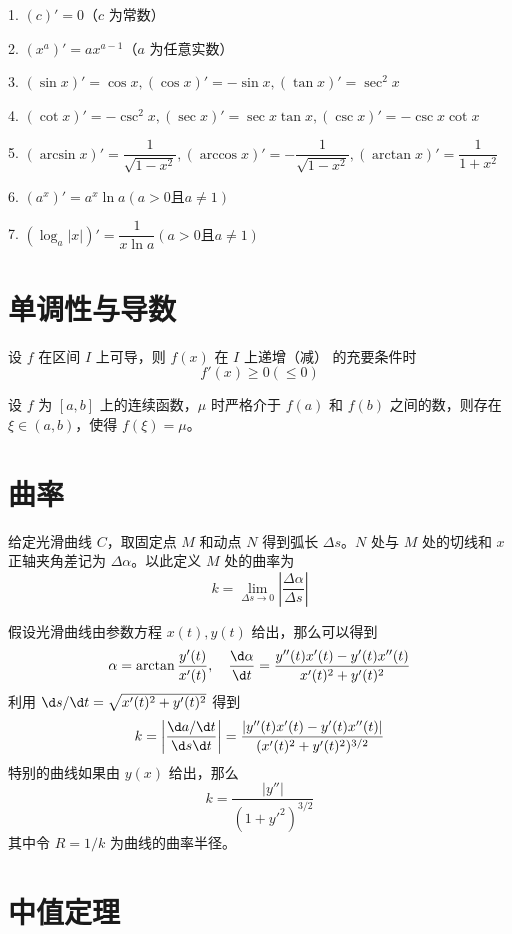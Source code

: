 1. $(c)' = 0$（$c$ 为常数）

2. $(x^a)' = ax^{a-1}$（$a$ 为任意实数）

3. $(\sin x)' = \cos x,(\cos x)'=-\sin x,(\tan x)'=\sec^2x$

4. $(\cot x)' = -\csc^2 x,(\sec x)'=\sec x \tan x,(\csc x)'=-\csc x \cot x$

5. $(\arcsin x)'=\dfrac{1}{\sqrt{1-x^2}},(\arccos x)' = -\dfrac{1}{\sqrt{1-x^2}},(\arctan x)'=\dfrac{1}{1+x^2}$

6. $(a^x)'=a^x \ln a(a>0\text{且}a\ne 1)$

7. $(\log_a|x|)'=\dfrac{1}{x\ln a}(a>0\text{且}a\ne 1)$

\section{单调性与导数}

\begin{theorem}
	设 $f$ 在区间 $I$ 上可导，则 $f(x)$ 在 $I$ 上递增（减） 的充要条件时
	$$f'(x) \geqslant 0(\leqslant 0)$$
\end{theorem}

\begin{theorem}[介值定理]
	设 $f$ 为 $[a,b]$ 上的连续函数，$\mu$ 时严格介于 $f(a)$ 和 $f(b)$ 之间的数，则存在 $\xi\in (a,b)$，使得 $f(\xi)=\mu$。
\end{theorem}

\section{曲率}

给定光滑曲线 $C$，取固定点 $M$ 和动点 $N$ 得到弧长 $\Delta s$。$N$ 处与 $M$ 处的切线和 $x$ 正轴夹角差记为 $\Delta \alpha$。以此定义 $M$ 处的曲率为
\[ k = \lim_{\Delta s \to 0} \left| \frac{\Delta \alpha}{\Delta s} \right| \]

假设光滑曲线由参数方程 $x(t), y(t)$ 给出，那么可以得到
\[ \alpha = \arctan \frac{y'(t)}{x'(t)}, \quad \frac{\d \alpha}{\d t} = \frac{y''(t)x'(t) - y'(t) x''(t)}{x'(t)^2 + y'(t)^2} \]
利用 $\d s/ \d t = \sqrt{x'(t)^2 + y'(t)^2}$ 得到
\[ k = \left| \frac{\d a / \d t}{\d s \d t} \right| = \frac{|y''(t)x'(t) - y'(t) x''(t)|}{(x'(t)^2 + y'(t)^2)^{3/2}} \]
特别的曲线如果由 $y(x)$ 给出，那么
\[ k = \frac{|y''|}{(1+y'^2)^{3/2}} \]
其中令 $R = 1/k$ 为曲线的曲率半径。

\section{中值定理}

